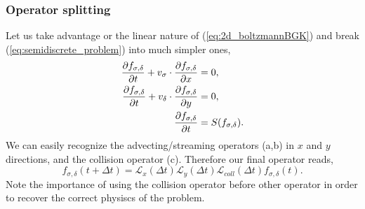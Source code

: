 \begin{frame} \frametitle{Operator splitting}
	Let us take advantage or the linear nature of (\ref{eq:2d_boltzmannBGK}) and break (\ref{eq:semidiscrete_problem}) into much simpler ones,
	\begin{subequations}
		\begin{align}
		\frac{\partial f_{\sigma,\delta}}{\partial t} + v_\sigma \cdot \frac{\partial f_{\sigma,\delta}}{\partial x} &= 0, \\
		\frac{\partial f_{\sigma,\delta}}{\partial t} + v_\delta \cdot \frac{\partial f_{\sigma,\delta}}{\partial y} &= 0, \\
		\frac{\partial f_{\sigma,\delta}}{\partial t} &= S(f_{\sigma,\delta}). 
		\end{align}
	\end{subequations}
	We can easily recognize the advecting/streaming operators (a,b) in $x$ and $y$ directions, and the collision operator (c). Therefore our final operator reads,
	\begin{equation}
		f_{\sigma,\delta}(t+\Delta t) = \mathcal{L}_x(\Delta t) \mathcal{L}_y(\Delta t) \mathcal{L}_{coll}(\Delta t) f_{\sigma,\delta}(t).
	\end{equation}
	Note the importance of using the collision operator before other operator in order to recover the correct physiscs of the problem.
\end{frame}